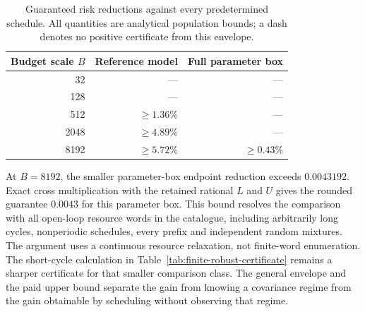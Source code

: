 \begin{table}[t]
\centering
\caption{Guaranteed risk reductions against every predetermined schedule.
All quantities are analytical population bounds; a dash denotes no positive certificate from this envelope.}
\label{tab:arbitrary-schedule}
\begin{tabular}{rrr}
\toprule
Budget scale $B$ & Reference model & Full parameter box\\
\midrule
32 & --- & ---\\
128 & --- & ---\\
512 & $\ge1.36\%$ & ---\\
2048 & $\ge4.89\%$ & ---\\
8192 & $\ge5.72\%$ & $\ge0.43\%$\\
\bottomrule
\end{tabular}
\end{table}

At $B=8192$, the smaller parameter-box endpoint reduction exceeds $0.0043192$.
Exact cross multiplication with the retained rational $L$ and $U$ gives the rounded guarantee $0.0043$ for this parameter box.
This bound resolves the comparison with all open-loop resource words in the catalogue, including arbitrarily long cycles, nonperiodic schedules, every prefix and independent random mixtures.
The argument uses a continuous resource relaxation, not finite-word enumeration.
The short-cycle calculation in Table~\ref{tab:finite-robust-certificate} remains a sharper certificate for that smaller comparison class.
The general envelope and the paid upper bound separate the gain from knowing a covariance regime from the gain obtainable by scheduling without observing that regime.

